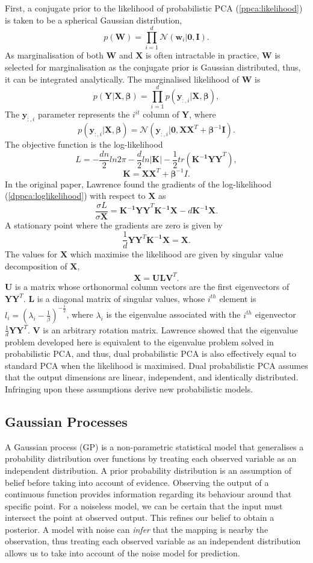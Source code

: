 \documentclass[ %
author={Dillon Keith Diep},
supervisor={Dr. Carl Henrik Ek},
degree={MEng},
title={ART-CG Hair:},
subtitle={Assisted Real-time Content Generation of Stylised Virtual Hair},
type={Research},
year={2017} ]{dissertation}
\begin{document}
First, a conjugate prior to the likelihood of probabilistic PCA (\ref{ppca:likelihood}) is taken to be a spherical Gaussian distribution,
$$p(\bm{W})=\prod^d_{i=1}\mathcal{N}(\bm{w}_i|\bm{0,I}).$$
As marginalisation of both $\bm{W}$ and $\bm{X}$ is often intractable in practice, $\bm{W}$ is selected for marginalisation as the conjugate prior is Gaussian distributed, thus, it can be integrated analytically.
The marginalised likelihood of $\bm{W}$ is
$$p(\bm{Y|X},\bm{\beta})=\prod^d_{i=1}p(\bm{y}_{:,i}|\bm{X},\bm{\beta}),$$
The $\bm{y}_{:,i}$ parameter represents the $i^{it}$ column of $\bm{Y}$, where
\begin{equation} \label{gplvm:marginal}
p(\bm{y}_{:,i}|\bm{X},\bm{\beta})=\mathcal{N}(\bm{y}_{:,i}|\bm{0,XX}^T+\bm{\beta}^{-1}\bm{I}).
\end{equation}
The objective function is the log-likelihood
\begin{equation} \label{dppca:loglikelihood}
L=-\frac{dn}{2}ln2\pi-\frac{d}{2}ln|\bm{K}|-\frac{1}{2}tr(\bm{K^{-1}YY}^T),
\end{equation}
$$\bm{K=XX}^T+\bm{\beta}^{-1}I.$$
In the original paper, Lawrence found the gradients of the log-likelihood (\ref{dppca:loglikelihood}) with respect to $\bm{X}$ as
$$\frac{\sigma L}{\sigma \bm{X}}=\bm{K^{-1}YY}^T\bm{K^{-1}X}-d\bm{K^{-1}X}.$$ 
A stationary point where the gradients are zero is given by
$$\frac{1}{d}\bm{YY}^T\bm{K^{-1}X=X}.$$
The values for $\bm{X}$ which maximise the likelihood are given by singular value decomposition of $\bm{X}$,
$$\bm{X=ULV}^T.$$
$\bm{U}$ is a matrix whose orthonormal column vectors are the first eigenvectors of $\bm{YY}^T$. $\bm{L}$ is a diagonal matrix of singular values, whose $i^{th}$ element is $l_i=(\lambda_i-\frac{1}{\beta})^{-\frac{1}{2}}$, where $\lambda_i$ is the eigenvalue associated with the $i^{th}$ eigenvector $\frac{1}{d}\bm{YY}^T$. $\bm{V}$ is an arbitrary rotation matrix. Lawrence showed that the eigenvalue problem developed here is equivalent to the eigenvalue problem solved in probabilistic PCA, and thus, dual probabilistic PCA is also effectively equal to standard PCA when the likelihood is maximised.
Dual probabilistic PCA assumes that the output dimensions are linear, independent, and identically distributed. Infringing upon these assumptions derive new probabilistic models.
\subsection{Gaussian Processes}
A Gaussian process (GP) is a non-parametric statistical model that generalises a probability distribution over functions by treating each observed variable as an independent distribution. A prior probability distribution is an assumption of belief before taking into account of evidence. Observing the output of a continuous function provides information regarding its behaviour around that specific point. For a noiseless model, we can be certain that the input must intersect the point at observed output. This refines our belief to obtain a posterior. A model with noise can \textit{infer} that the mapping is nearby the observation, thus treating each observed variable as an independent distribution allows us to take into account of the noise model for prediction.
\end{document}
